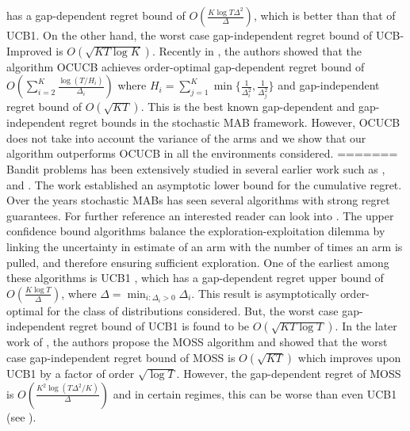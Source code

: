 has a gap-dependent regret bound of $O\left(\frac{K\log T\Delta^{2}}{\Delta}\right)$, which is better than that of UCB1. On the other hand, the worst case gap-independent regret bound of UCB-Improved is $O\left(\sqrt{KT\log K}\right)$. Recently in \cite{lattimore2015optimally}, the authors showed that  the algorithm OCUCB achieves order-optimal gap-dependent regret bound of $O\left(\sum_{i=2}^{K}\frac{\log\left(T/H_i\right)}{\Delta_i}\right)$ where $H_i=\sum_{j=1}^{K}\min\lbrace \frac{1}{\Delta_i^2},\frac{1}{\Delta_j^2}\rbrace$ and gap-independent regret bound of $O\left( \sqrt{KT}\right)$. This is the best known gap-dependent and gap-independent regret bounds in the stochastic MAB framework. However, OCUCB does not take into account the variance of the arms and we show that our algorithm outperforms OCUCB in all the environments considered. 
=======
	Bandit problems has been extensively studied in several earlier work such as \citet{thompson1933likelihood}, \citet{robbins1952some} and \citet{lai1985asymptotically}. The \citet{lai1985asymptotically} work established an asymptotic lower bound for the cumulative regret. Over the years stochastic MABs has seen several algorithms with strong regret guarantees. For further reference an interested reader can look into \citet{bubeck2012bandits}. The upper confidence bound algorithms balance the exploration-exploitation dilemma by linking the uncertainty in estimate of an arm with the number of times an arm is pulled, and therefore ensuring sufficient exploration. One of the earliest among these algorithms is UCB1 \citep{auer2002finite}, which has a gap-dependent regret upper bound of  $O\left(\frac{K\log T}{\Delta}\right)$, where $\Delta = \min_{i:\Delta_i>0} \Delta_i$. This result is asymptotically order-optimal for the class of distributions considered. But, the worst case gap-independent regret bound of UCB1 is found to be  $O \left(\sqrt{KT\log T}\right)$. In the later work of \citet{audibert2009minimax}, the authors propose the MOSS algorithm and showed that the worst case gap-independent regret bound of MOSS is $O\left( \sqrt{KT} \right)$ which improves upon UCB1 by a factor of order $\sqrt{\log T}$. However, the gap-dependent regret of MOSS is $O\left( \frac{K^{2}\log\left(T\Delta^{2}/K\right)}{\Delta}\right)$ and in certain regimes, this can be worse than even UCB1 (see \citet{audibert2009minimax,lattimore2015optimally}).
	

